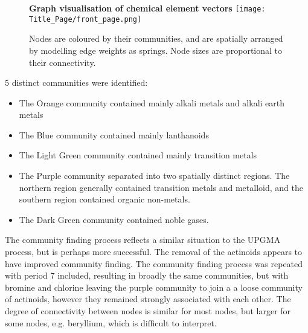 \begin{center}
\begin{figure}[H]
  \centering
  \textbf{Graph visualisation of chemical element vectors}
    \texttt{[image: Title\_Page/front\_page.png]}
    \caption[Graph visualisation of chemical element vectors]{Nodes are coloured by their communities, and are spatially arranged by modelling edge weights as springs. Node sizes are proportional to their connectivity. }
    \label{fig:elems_graph}
\end{figure} 
\end{center}
5 distinct communities were identified:
\begin{itemize}
\itemsep-0.5em
\item The Orange community contained mainly alkali metals and alkali earth metals
\item The Blue community contained mainly lanthanoids
\item The Light Green community contained mainly transition metals
\item The Purple community separated into two spatially distinct regions. The northern region generally contained transition metals and metalloid, and the southern region contained organic non-metals.
\item The Dark Green community contained noble gases.
\end{itemize}
The community finding process reflects a similar situation to the UPGMA process, but is perhaps more successful. The removal of the actinoids appears to have improved community finding. The community finding process was repeated with period 7 included, resulting in broadly the same communities, but with bromine and chlorine leaving the purple community to join a a loose community of actinoids, however they remained strongly associated with each other. The degree of connectivity between nodes is similar for most nodes, but larger for some nodes, e.g. beryllium, which is difficult to interpret. 

